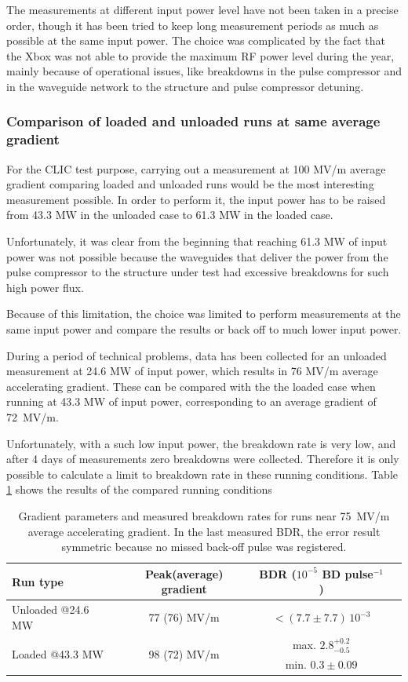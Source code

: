 The measurements at different input power level have not been taken in a precise order, though it has been tried to keep long measurement periods as much as possible at the same input power. 
The choice was complicated by the fact that the Xbox was not able to provide the maximum RF power level during the year, mainly because of operational issues, like breakdowns in the pulse compressor and in the waveguide network to the structure and pulse compressor detuning.


\subsubsection{Comparison of loaded and unloaded runs at same average gradient}

For the CLIC test purpose,  carrying out a measurement at 100 MV/m average gradient comparing loaded and unloaded runs would be the most interesting measurement possible. In order to perform it, the input power has to be raised from 43.3 MW in the unloaded case to 61.3 MW in the loaded case.

Unfortunately, it was clear from the beginning that reaching 61.3 MW of input power was not possible because the waveguides that deliver the power from the pulse compressor to the structure under test had excessive breakdowns for such high power flux.

Because of this limitation, the choice was limited to perform measurements at the same input power and compare the results or back off to much lower input power. 

During a period of technical problems, data has been collected for an unloaded measurement at 24.6 MW of input power, which results in 76 MV/m average accelerating gradient. These can be compared with the the loaded case when running at 43.3 MW of input power, corresponding to an average gradient of 72~MV/m. 

Unfortunately, with a such low input power, the breakdown rate is very low, and after 4 days of measurements zero breakdowns were collected. Therefore it is only possible to calculate a limit to breakdown rate in these running conditions. Table \ref{comp_avg75} shows the results of the compared running conditions


\begin{table}[h]
  \centering
    \begin{tabular}{ l c c c }
    \hline
    \hline
    Run type							&		Peak(average) gradient  			& BDR ($10^{-5}$ BD pulse$^{-1}$)	\\
    \hline
    Unloaded	@24.6 MW 				&		77 (76) MV/m				&	$< (7.7 \pm 7.7) \, 10^{-3} $ 			\\
    \multirow{ 2}{*}{Loaded  @43.3 MW} 		&		\multirow{ 2}{*}{98 (72) MV/m} 	& 	max. $2.8^{+0.2} _{-0.5}$    		\\
    									&									&	min. $0.3\pm0.09$	\\
    \hline
    \hline
    \end{tabular}
\caption{Gradient parameters and measured breakdown rates for runs near 75~MV/m average accelerating gradient. In the last measured BDR, the error result symmetric because no missed back-off pulse was registered. }
\label{comp_avg75}
\end{table}

